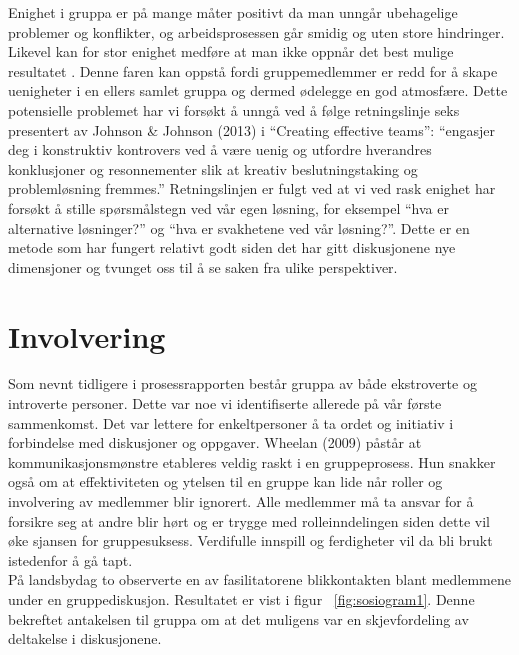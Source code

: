 Enighet i gruppa er på mange måter positivt da man unngår ubehagelige problemer og konflikter, og arbeidsprosessen går smidig og uten store hindringer. Likevel kan for stor enighet medføre at man ikke oppnår det best mulige resultatet \citep{effectiveTeams}. Denne faren kan oppstå fordi gruppemedlemmer er redd for å skape uenigheter i en ellers samlet gruppa og dermed ødelegge en god atmosfære. Dette potensielle problemet har vi forsøkt å unngå ved å følge retningslinje seks presentert av Johnson \& Johnson (2013)\citep{gruppeteori} i ``Creating effective teams'': ``engasjer deg i konstruktiv kontrovers ved å være uenig og utfordre hverandres konklusjoner og resonnementer slik at kreativ beslutningstaking og problemløsning fremmes.'' Retningslinjen er fulgt ved at vi ved rask enighet har forsøkt å stille spørsmålstegn ved vår egen løsning, for eksempel ``hva er alternative løsninger?'' og ``hva er svakhetene ved vår løsning?''. Dette er en metode som har fungert relativt godt siden det har gitt diskusjonene nye dimensjoner og tvunget oss til å se saken fra ulike perspektiver.\\

\section{Involvering}
\label{sec:involvering}
Som nevnt tidligere i prosessrapporten består gruppa av både ekstroverte og introverte personer. Dette var noe vi identifiserte allerede på vår første sammenkomst. Det var lettere for enkeltpersoner å ta ordet og initiativ i forbindelse med diskusjoner og oppgaver. Wheelan (2009)\citep{effectiveTeams} påstår at kommunikasjonsmønstre etableres veldig raskt i en gruppeprosess. Hun snakker også om at effektiviteten og ytelsen til en gruppe kan lide når roller og involvering av medlemmer blir ignorert. Alle medlemmer må ta ansvar for å forsikre seg at andre blir hørt og er trygge med rolleinndelingen siden dette vil øke sjansen for gruppesuksess. Verdifulle innspill og ferdigheter vil da bli brukt istedenfor å gå tapt.\\

På landsbydag to observerte en av fasilitatorene blikkontakten blant medlemmene under en gruppediskusjon. Resultatet er vist i figur ~\ref{fig:sosiogram1}. Denne bekreftet antakelsen til gruppa om at det muligens var en skjevfordeling av deltakelse i diskusjonene.\\

